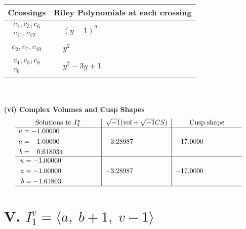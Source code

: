\documentclass[1p]{elsarticle_modified}
\theoremstyle{definition}
\newcommand{\I}{\sqrt{-1}}
\begin{document}
\begin{tabular}{m{50pt}|m{274pt}}
Crossings & \hspace{64pt}Riley Polynomials at each crossing \\
\hline $$\begin{aligned}c_{1},c_{3},c_{6}\\c_{11},c_{12}\end{aligned}$$&$\begin{aligned}
&(y-1)^2
\end{aligned}$\\
\hline $$\begin{aligned}c_{2},c_{7},c_{10}\end{aligned}$$&$\begin{aligned}
&y^2
\end{aligned}$\\
\hline $$\begin{aligned}c_{4},c_{5},c_{8}\\c_{9}\end{aligned}$$&$\begin{aligned}
&y^2-3 y+1
\end{aligned}$\\
\hline
\end{tabular}\\~\\
\newpage\flushleft \textbf{(vi) Complex Volumes and Cusp Shapes}
$$\begin{array}{c|c|c}  
\text{Solutions to }I^u_{4}& \I (\text{vol} + \sqrt{-1}CS) & \text{Cusp shape}\\
 \hline 
\begin{aligned}
u &= -1.00000\phantom{ +0.000000I} \\
a &= -1.00000\phantom{ +0.000000I} \\
b &= \phantom{-}0.618034\phantom{ +0.000000I}\end{aligned}
 & -3.28987\phantom{ +0.000000I} & -17.0000\phantom{ +0.000000I} \\ \hline\begin{aligned}
u &= -1.00000\phantom{ +0.000000I} \\
a &= -1.00000\phantom{ +0.000000I} \\
b &= -1.61803\phantom{ +0.000000I}\end{aligned}
 & -3.28987\phantom{ +0.000000I} & -17.0000\phantom{ +0.000000I}\\
 \hline 
 \end{array}$$\newpage\newpage\renewcommand{\arraystretch}{1}
\centering \section*{V. $I^v_{1}= \langle a,\;b+1,\;v-1 \rangle$}
\end{document}
